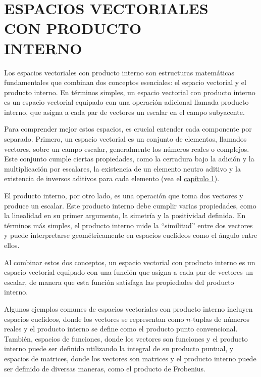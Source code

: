\chapter[ESPACIOS VECTORIALES CON PRODUCTO INTERNO]{ESPACIOS VECTORIALES \\ CON PRODUCTO \\ INTERNO}
\printchaptertableofcontents

Los espacios vectoriales con producto interno son estructuras matemáticas fundamentales que combinan dos conceptos esenciales: el espacio vectorial y el producto interno. En términos simples, un espacio vectorial con producto interno es un espacio vectorial equipado con una operación adicional llamada producto interno, que asigna a cada par de vectores un escalar en el campo subyacente.

Para comprender mejor estos espacios, es crucial entender cada componente por separado. Primero, un espacio vectorial es un conjunto de elementos, llamados vectores, sobre un campo escalar, generalmente los números reales o complejos. Este conjunto cumple ciertas propiedades, como la cerradura bajo la adición y la multiplicación por escalares, la existencia de un elemento neutro aditivo y la existencia de inversos aditivos para cada elemento (vea el \hyperref[chap:ev]{capítulo 1}).

El producto interno, por otro lado, es una operación que toma dos vectores y produce un escalar. Este producto interno debe cumplir varias propiedades, como la linealidad en su primer argumento, la simetría y la positividad definida. En términos más simples, el producto interno mide la “similitud” entre dos vectores y puede interpretarse geométricamente en espacios euclídeos como el ángulo entre ellos.

Al combinar estos dos conceptos, un espacio vectorial con producto interno es un espacio vectorial equipado con una función que asigna a cada par de vectores un escalar, de manera que esta función satisfaga las propiedades del producto interno.

Algunos ejemplos comunes de espacios vectoriales con producto interno incluyen espacios euclídeos, donde los vectores se representan como $n$-tuplas de números reales y el producto interno se define como el producto punto convencional. También, espacios de funciones, donde los vectores son funciones y el producto interno puede ser definido utilizando la integral de su producto puntual, y espacios de matrices, donde los vectores son matrices y el producto interno puede ser definido de diversas maneras, como el producto de Frobenius.

